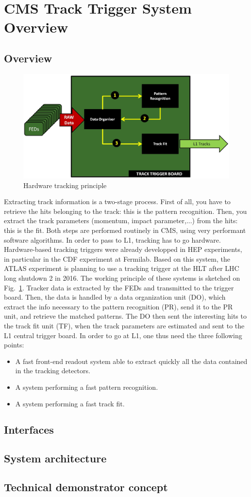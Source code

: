 \section{CMS Track Trigger System Overview}

\subsection{Overview}

\begin{figure}[ht!]
\centering
\includegraphics[width=0.5\columnwidth]{Plots/L1TTrigPrinciple.eps}
\caption{Hardware tracking principle}
\label{fig:L1TT_principle}
\end{figure}

\noindent Extracting track information is a two-stage process. First of all, you have to retrieve the hits belonging to the track: this is the pattern recognition. Then, you extract the track parameters (momentum, impact parameter,...) from the hits: this is the fit. Both steps are performed routinely in CMS, using very performant software algorithms. In order to pass to L1, tracking has to go hardware. Hardware-based tracking triggers were already developped in HEP experiments, in particular in the CDF experiment at Fermilab. Based on this system, the ATLAS experiment is planning to use a tracking trigger at the HLT after LHC long shutdown 2 in 2016. The working principle of these systems is sketched on Fig.~\ref{fig:L1TT_principle}. Tracker data is extracted by the FEDs and transmitted to the trigger board. Then, the data is handled by a data organization unit (DO), which extract the info necessary to the pattern recognition (PR), send it to the PR unit, and retrieve the matched patterns. The DO then sent the interesting hits to the track fit unit (TF), when the track parameters are estimated and sent to the L1 central trigger board.
\noindent In order to go at L1, one thus need the three following points: 

\begin{itemize}
\item A fast front-end readout system able to extract quickly all the data contained in the tracking detectors.
\item A system performing a fast pattern recognition.
\item A system performing a fast track fit.
\end{itemize}

\subsection{Interfaces}

\subsection{System architecture}

\subsection{Technical demonstrator concept}


\clearpage
